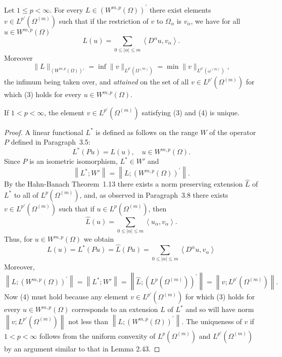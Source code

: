 \begin{theorem}
  Let $1 \leq p<\infty$. For every $L \in\left(W^{m,p}(\Omega)\right)^{\prime}$ there exist 
  elements $v \in L^{p'}(\Omega^{(m)})$ such that if the restriction of $v$ to 
  $\Omega_\alpha$ is $v_\alpha$, we have for all $u \in W^{m,p}(\Omega)$
  \begin{equation}\label{eq:3.3}
  L(u)=\sum_{0 \leq|\alpha| \leq m}\left\langle D^\alpha u, v_\alpha\right\rangle .
  \end{equation}
  Moreover
  \begin{equation}\label{eq:3.4}
    \|L\|_{(W^{m,p}(\Omega))'} = \inf \|v\|_{L^{p'}(\Omega^{(m)})}
    = \min \|v\|_{L^{p'}(\omega^{(m)})},
  \end{equation}
  the infimum being taken over, and \emph{attained} on the set of all $v\in L^{p'}(\Omega^{(m)})$
  for which (3) holds for every $u\in W^{m,p}(\Omega)$.

  If $1<p<\infty$, the element $v \in L^{p'}(\Omega^{(m)})$ satisfying (3) and (4) is unique.
\end{theorem}


\begin{proof}
  A linear functional $L^*$ is defined as follows on the range $W$ of the operator $P$
  defined in Paragraph~3.5:
  \[
  L^*(Pu) = L(u), \quad u \in W^{m,p}(\Omega) .
  \]
  Since $P$ is an isometric isomorphism, $L^* \in W'$ and
  \[
  \left\|L^* ; W'\right\|=\left\|L ;\left(W^{m,p}(\Omega)\right)^{\prime}\right\| .
  \]
  By the Hahn-Banach Theorem~1.13 there exists a norm preserving extension $\hat{L}$ of $L^*$
  to all of $L^p(\Omega^{(m)})$, and, as observed in Paragraph~3.8
  there exists $v \in L^{p'}(\Omega^{(m)})$ such that if $u \in L^p(\Omega^{(m)})$, then
  \[
  \hat{L}(u) = \sum_{0 \leq|\alpha| \leq m}\left\langle u_\alpha, v_\alpha\right\rangle .
  \]
  Thus, for $u \in W^{m,p}(\Omega)$ we obtain
  \[
  L(u)=L^*(P u)=\hat{L}(P u)=\sum_{0 \leq|\alpha| \leq m}\left\langle D^\alpha u, v_\alpha\right\rangle
  \]
  Moreover,
  \[
  \left\|L ;\left(W^{m,p}(\Omega)\right)^{\prime}\right\|
    = \left\|L^* ; W'\right\|
    = \left\|\hat{L} ;\left(L^p(\Omega^{(m)})\right)^{\prime}\right\|
    = \left\|v ; L^{p'}(\Omega^{(m)})\right\| .
  \]
  Now (4) must hold because any element $v \in L^{p'}(\Omega^{(m)})$ for which (3) holds for every $u \in W^{m,p}(\Omega)$ corresponds to an extension $L$ of $L^*$ and so will have norm $\left\|v ; L^{p'}(\Omega^{(m)})\right\|$ not less than $\left\|L ;\left(W^{m,p}(\Omega)\right)^{\prime}\right\|$.
  The uniqueness of $v$ if $1<p<\infty$ follows from the uniform convexity of $L^p(\Omega^{(m)})$ and $L^{p'}(\Omega^{(m)})$ by an argument similar to that in Lemma 2.43.
\end{proof}


